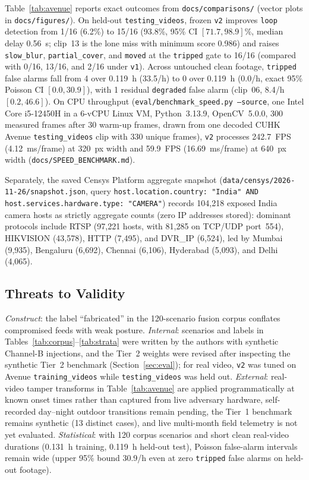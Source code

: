 \documentclass[journal]{IEEEtran}
\begin{document}
Table~\ref{tab:avenue} reports exact outcomes from \texttt{docs/comparisons/} (vector plots in \texttt{docs/figures/}). On held-out \texttt{testing\_videos}, frozen \texttt{v2} improves \texttt{loop} detection from 1/16 (6.2\%) to 15/16 (93.8\%, 95\% CI $[71.7, 98.9]$\%, median delay 0.56~s; clip~13 is the lone miss with minimum score 0.986) and raises \texttt{slow\_blur}, \texttt{partial\_cover}, and \texttt{moved} at the \texttt{tripped} gate to 16/16 (compared with 0/16, 13/16, and 2/16 under \texttt{v1}). Across untouched clean footage, \texttt{tripped} false alarms fall from 4 over 0.119~h (33.5/h) to 0 over 0.119~h (0.0/h, exact 95\% Poisson CI $[0.0, 30.9]$), with 1 residual \texttt{degraded} false alarm (clip~06, 8.4/h $[0.2, 46.6]$). On CPU throughput (\texttt{eval/benchmark\_speed.py --source}, one Intel Core i5-12450H in a 6-vCPU Linux VM, Python~3.13.9, OpenCV~5.0.0, 300 measured frames after 30 warm-up frames, drawn from one decoded CUHK Avenue \texttt{testing\_videos} clip with 330 unique frames), \texttt{v2} processes 242.7~FPS (4.12~ms/frame) at 320~px width and 59.9~FPS (16.69~ms/frame) at 640~px width (\texttt{docs/SPEED\_BENCHMARK.md}).

Separately, the saved Censys Platform aggregate snapshot (\texttt{data/censys/2026-11-26/snapshot.json}, query \texttt{host.location.country: "India" AND host.services.hardware.type: "CAMERA"}) records 104,218 exposed India camera hosts as strictly aggregate counts (zero IP addresses stored): dominant protocols include RTSP (97,221 hosts, with 81,285 on TCP/UDP port~554), HIKVISION (43,578), HTTP (7,495), and DVR\_IP (6,524), led by Mumbai (9,935), Bengaluru (6,692), Chennai (6,106), Hyderabad (5,093), and Delhi (4,065).

\subsection{Threats to Validity}
\emph{Construct}: the label ``fabricated'' in the 120-scenario fusion corpus conflates compromised feeds with weak posture. \emph{Internal}: scenarios and labels in Tables~\ref{tab:corpus}--\ref{tab:strata} were written by the authors with synthetic Channel-B injections, and the Tier~2 weights were revised after inspecting the synthetic Tier~2 benchmark (Section~\ref{sec:eval}); for real video, \texttt{v2} was tuned on Avenue \texttt{training\_videos} while \texttt{testing\_videos} was held out. \emph{External}: real-video tamper transforms in Table~\ref{tab:avenue} are applied programmatically at known onset times rather than captured from live adversary hardware, self-recorded day--night outdoor transitions remain pending, the Tier~1 benchmark remains synthetic (13 distinct cases), and live multi-month field telemetry is not yet evaluated. \emph{Statistical}: with 120 corpus scenarios and short clean real-video durations (0.131~h training, 0.119~h held-out test), Poisson false-alarm intervals remain wide (upper 95\% bound 30.9/h even at zero \texttt{tripped} false alarms on held-out footage).
\end{document}
